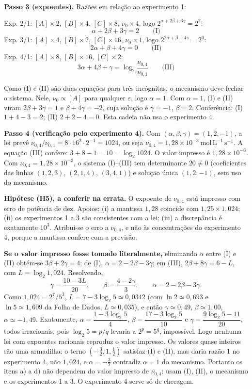 \documentclass{article}%
\begin{document}
\textbf{Passo 3 (expoentes).} Razões em relação ao experimento 1:

Exp. 2/1: $[A]\times2$, $[B]\times4$, $[C]\times8$, $\nu_0\times4$, logo $2^{\alpha+2\beta+3\gamma}=2^{2}$:
\[ \alpha+2\beta+3\gamma=2 \qquad\text{(I)} \]
Exp. 3/1: $[A]\times4$, $[B]\times2$, $[C]\times16$, $\nu_0\times1$, logo $2^{2\alpha+\beta+4\gamma}=2^{0}$:
\[ 2\alpha+\beta+4\gamma=0 \qquad\text{(II)} \]
Exp. 4/1: $[A]\times8$, $[B]\times16$, $[C]\times2$:
\[ 3\alpha+4\beta+\gamma=\log_2\frac{\nu_{0,4}}{\nu_{0,1}} \qquad\text{(III)} \]

Como (I) e (II) são duas equações para três incógnitas, o mecanismo deve fechar o sistema. Nele, $\nu_0\propto[A]$ para qualquer $\varepsilon$, logo $\alpha=1$. Com $\alpha=1$, (I) e (II) viram $2\beta+3\gamma=1$ e $\beta+4\gamma=-2$, cuja solução é $\gamma=-1$, $\beta=2$. Conferência: (I) $1+4-3=2$; (II) $2+2-4=0$. Esta cadeia não usa o experimento 4.

\textbf{Passo 4 (verificação pelo experimento 4).} Com $(\alpha,\beta,\gamma)=(1,2,-1)$, a lei prevê $\nu_{0,4}/\nu_{0,1}=8\cdot16^2\cdot2^{-1}=1024$, ou seja $\nu_{0,4}=1{,}28\times10^{-3}\ \mathrm{mol\,L^{-1}\,s^{-1}}$. A equação (III) confere: $3+8-1=10=\log_2 1024$. O valor impresso é $1{,}28\times10^{-6}$. Com $\nu_{0,4}=1{,}28\times10^{-3}$, o sistema (I)–(III) tem determinante $20\neq0$ (coeficientes das linhas $(1,2,3)$, $(2,1,4)$, $(3,4,1)$) e solução única $(1,2,-1)$, sem uso do mecanismo.

\textbf{Hipótese (H5), a conferir na errata.} O expoente de $\nu_{0,4}$ está impresso com erro de potência de dez. Apoios: (i) a mantissa $1{,}28$ coincide com $1{,}25\times1{,}024$; (ii) os experimentos 1 a 3 são consistentes com a lei; (iii) a discrepância é exatamente $10^{3}$. Atribui-se o erro a $\nu_{0,4}$, e não às concentrações do experimento 4, porque a mantissa confere com a previsão.

\textbf{Se o valor impresso fosse tomado literalmente,} eliminando $\alpha$ entre (I) e (II) obtém-se $3\beta+2\gamma=4$; de (I), $\alpha=2-2\beta-3\gamma$; em (III), $2\beta+8\gamma=6-L$, com $L=\log_2 1{,}024$. Resolvendo,
\[ \gamma=\frac{10-3L}{20},\qquad \beta=\frac{4-2\gamma}{3},\qquad \alpha=2-2\beta-3\gamma. \]
Como $1{,}024=2^{7}/5^{3}$, $L=7-3\log_2 5\simeq0{,}0342$ (com $\ln2\simeq0{,}693$ e $\ln5\simeq1{,}609$ da Folha de Dados, $L\simeq0{,}035$), e então $\gamma\simeq0{,}49$, $\beta\simeq1{,}00$, $\alpha\simeq-1{,}49$. Exatamente, $\alpha=\dfrac{1-3\log_2 5}{4}$, $\beta=\dfrac{17-3\log_2 5}{10}$ e $\gamma=\dfrac{9\log_2 5-11}{20}$, todos irracionais, pois $\log_2 5=p/q$ levaria a $2^{p}=5^{q}$, impossível. Logo nenhuma lei com expoentes racionais reproduz o valor impresso. Os valores quase inteiros são uma armadilha: o terno $\left(-\tfrac{3}{2},1,\tfrac{1}{2}\right)$ satisfaz (I) e (II), mas daria razão $1$ no experimento 4, não $1{,}024$, e $\alpha=-\tfrac{3}{2}$ contradiz $\alpha=1$ do mecanismo. Portanto os itens a) a d) não dependem do valor impresso de $\nu_{0,4}$: usam (I), (II), o mecanismo e os experimentos 1 a 3. O experimento 4 serve só de checagem.
\end{document}
